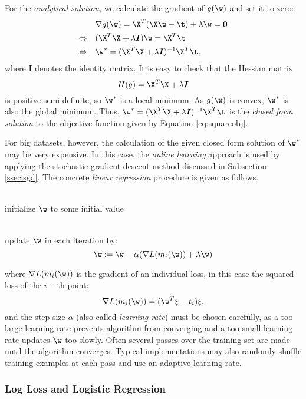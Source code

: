 For the \emph{analytical solution}, we calculate the gradient of $g(\w)$ and set it to zero: 
\[ \begin{split}
& \nabla g(\w) = \X^T(\X\w - \t) + \lambda\w = \boldsymbol{0}  \\
\Leftrightarrow \quad & (\X^T \X + \lambda \boldsymbol{I}) \w = \X^T \t \\
\Leftrightarrow \quad & \w^* = (\X^T\X + \lambda \boldsymbol{I})^{-1}\X^T \t, 
\end{split} \]
where $\boldsymbol{I}$ denotes the identity matrix. It is easy to check that the Hessian matrix $$H(g) = \X^T\X + \lambda \boldsymbol{I}$$ is positive semi definite, so $\w^*$ is a local minimum. As $g(\w)$ is convex, $\w^*$ is also the global minimum. Thus, $\w^* = (\X^T\X + \lambda \boldsymbol{I})^{-1}\X^T \t$ is the \emph{closed form solution} to the objective function given by Equation \ref{eq:squareobj}.

For big datasets, however, the calculation of the given closed form solution of $\w^*$ may be very expensive. In this case, the \emph{online learning} approach is used by applying the stochastic gradient descent method discussed in Subsection \ref{ssec:sgd}. The concrete \emph{linear regression} procedure is given as follows. 
\begin{description}
\setlength{\itemsep}{0cm}
\setlength{\parskip}{0cm}
\item[Step 1:] \hfill \\initialize $\w$ to some initial value
\item[Step 2:] \hfill \\update $\w$ in each iteration by: 
$$\w := \w - \alpha (\nabla L(m_i(\w)) + \lambda \w)$$
\end{description}
where $\nabla L(m_i(\w))$ is the gradient of an individual loss, in this case the squared loss of the $i-$th point:
$$\nabla L(m_i(\w)) = (\w^T \xi - t_i)\xi,$$
and the step size $\alpha$ (also called \emph{learning rate}) must be chosen carefully, as a too large learning rate prevents algorithm from converging and a too small learning rate updates $\w$ too slowly. Often several passes over the training set are made until the algorithm converges. Typical implementations may also randomly shuffle training examples at each pass and use an adaptive learning rate.

\subsubsection{Log Loss and Logistic Regression}


